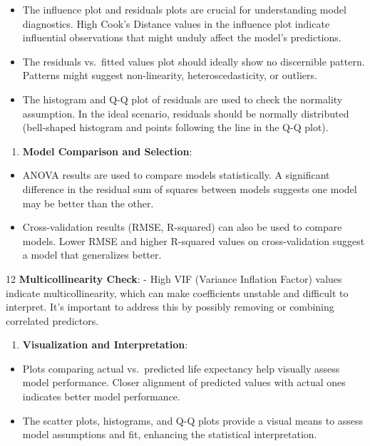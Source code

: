 \documentclass[
]{article}
\providecommand{\tightlist}{%
  \setlength{\itemsep}{0pt}\setlength{\parskip}{0pt}}
\begin{document}
\begin{itemize}
\tightlist
\item
  The influence plot and residuals plots are crucial for understanding
  model diagnostics. High Cook's Distance values in the influence plot
  indicate influential observations that might unduly affect the model's
  predictions.
\item
  The residuals vs.~fitted values plot should ideally show no
  discernible pattern. Patterns might suggest non-linearity,
  heteroscedasticity, or outliers.
\item
  The histogram and Q-Q plot of residuals are used to check the
  normality assumption. In the ideal scenario, residuals should be
  normally distributed (bell-shaped histogram and points following the
  line in the Q-Q plot).
\end{itemize}

\begin{enumerate}
\def\labelenumi{\arabic{enumi}.}
\setcounter{enumi}{10}
\tightlist
\item
  \textbf{Model Comparison and Selection}:
\end{enumerate}

\begin{itemize}
\tightlist
\item
  ANOVA results are used to compare models statistically. A significant
  difference in the residual sum of squares between models suggests one
  model may be better than the other.
\item
  Cross-validation results (RMSE, R-squared) can also be used to compare
  models. Lower RMSE and higher R-squared values on cross-validation
  suggest a model that generalizes better.
\end{itemize}

12 \textbf{Multicollinearity Check}: - High VIF (Variance Inflation
Factor) values indicate multicollinearity, which can make coefficients
unstable and difficult to interpret. It's important to address this by
possibly removing or combining correlated predictors.

\begin{enumerate}
\def\labelenumi{\arabic{enumi}.}
\setcounter{enumi}{12}
\tightlist
\item
  \textbf{Visualization and Interpretation}:
\end{enumerate}

\begin{itemize}
\tightlist
\item
  Plots comparing actual vs.~predicted life expectancy help visually
  assess model performance. Closer alignment of predicted values with
  actual ones indicates better model performance.
\item
  The scatter plots, histograms, and Q-Q plots provide a visual means to
  assess model assumptions and fit, enhancing the statistical
  interpretation.
\end{itemize}
\end{document}
